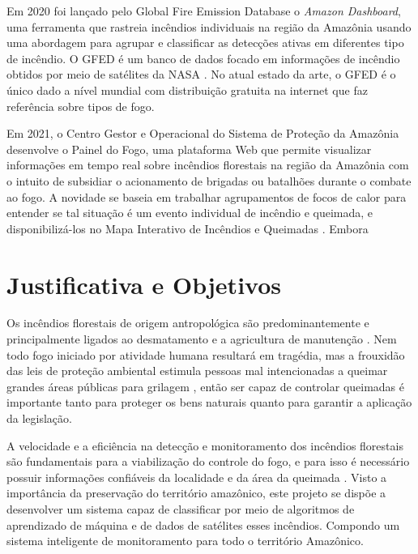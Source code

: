 Em 2020 foi lançado pelo Global Fire Emission Database o \textit{Amazon Dashboard}, uma ferramenta que rastreia incêndios individuais na região da Amazônia usando uma abordagem para agrupar e classificar as detecções ativas em diferentes tipo de incêndio. O GFED é um banco de dados focado em informações de incêndio obtidos por meio de satélites da NASA \cite{gfed}. No atual estado da arte, o GFED é o único dado a nível mundial com distribuição gratuita na internet que faz referência sobre tipos de fogo. 

Em 2021, o Centro Gestor e Operacional do Sistema de Proteção da Amazônia desenvolve o Painel do Fogo, uma plataforma Web que permite visualizar informações em tempo real sobre incêndios florestais na região da Amazônia com o intuito de subsidiar o acionamento de brigadas ou batalhões durante o combate ao fogo. A novidade se baseia em trabalhar agrupamentos de focos de calor para entender se tal situação é um evento individual de incêndio e queimada, e disponibilizá-los no Mapa Interativo de Incêndios e Queimadas \cite{painel-fogo}. Embora 







\section{Justificativa e Objetivos}


Os incêndios florestais de origem antropológica são predominantemente e principalmente ligados ao desmatamento e a agricultura de manutenção \cite{severidade}. Nem todo fogo iniciado por atividade humana resultará em tragédia, mas a frouxidão das leis de proteção ambiental estimula pessoas mal intencionadas a queimar grandes áreas públicas para grilagem \cite{jornal_ambiental}, então ser capaz de controlar queimadas é importante tanto para proteger os bens naturais quanto para garantir a aplicação da legislação.

A velocidade e a eficiência na detecção e monitoramento dos incêndios florestais são 
fundamentais para a viabilização do controle do fogo, e para isso é necessário possuir informações confiáveis da localidade e da área da queimada \cite{batista}. Visto a importância da preservação do território amazônico, este projeto se dispõe a desenvolver um sistema capaz de classificar por meio de algoritmos de aprendizado de máquina e de dados de satélites esses incêndios. Compondo um sistema inteligente de monitoramento para todo o território Amazônico.

